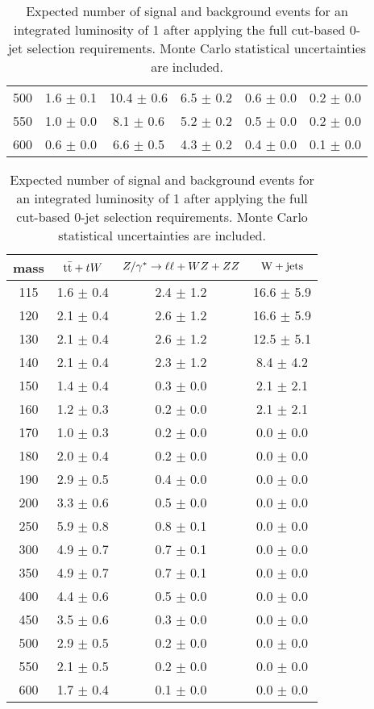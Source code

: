 \begin{table}[!ht]
\begin{center}
{\begin{tabular} {|c|c|c|c|c|c|}
500 &    1.6 $\pm$   0.1 &  10.4	 $\pm$    0.6  &   6.5 $\pm$   0.2 &   0.6 $\pm$   0.0 &   0.2 $\pm$   0.0 \\
550 &    1.0 $\pm$   0.0 &   8.1	 $\pm$    0.6  &   5.2 $\pm$   0.2 &   0.5 $\pm$   0.0 &   0.2 $\pm$   0.0 \\
600 &    0.6 $\pm$   0.0 &   6.6	 $\pm$    0.5  &   4.3 $\pm$   0.2 &   0.4 $\pm$   0.0 &   0.1 $\pm$   0.0 \\
 \hline
  \end{tabular}
  }
 {\normalsize
  \begin{tabular} {|c|c|c|c|}
\hline
  mass    & $\mathrm{t}\bar{\mathrm{t}}+tW$ & $Z/\gamma^*\to\ell\ell+WZ+ZZ$ & $\mathrm{W+jets}$\\
  \hline
  \hline
115 &  1.6 $\pm$	0.4 &	2.4 $\pm$   1.2 &  16.6 $\pm$	5.9  \\
120 &  2.1 $\pm$	0.4 &	2.6 $\pm$   1.2 &  16.6 $\pm$	5.9  \\
130 &  2.1 $\pm$	0.4 &	2.6 $\pm$   1.2 &  12.5 $\pm$	5.1  \\
140 &  2.1 $\pm$	0.4 &	2.3 $\pm$   1.2 &   8.4 $\pm$	4.2  \\
150 &  1.4 $\pm$	0.4 &	0.3 $\pm$   0.0 &   2.1 $\pm$	2.1  \\
160 &  1.2 $\pm$	0.3 &	0.2 $\pm$   0.0 &   2.1 $\pm$	2.1  \\
170 &  1.0 $\pm$	0.3 &	0.2 $\pm$   0.0 &   0.0 $\pm$	0.0  \\
180 &  2.0 $\pm$	0.4 &	0.2 $\pm$   0.0 &   0.0 $\pm$	0.0  \\
190 &  2.9 $\pm$	0.5 &	0.4 $\pm$   0.0 &   0.0 $\pm$	0.0  \\
200 &  3.3 $\pm$	0.6 &	0.5 $\pm$   0.0 &   0.0 $\pm$	0.0  \\
250 &  5.9 $\pm$	0.8 &	0.8 $\pm$   0.1 &   0.0 $\pm$	0.0  \\
300 &  4.9 $\pm$	0.7 &	0.7 $\pm$   0.1 &   0.0 $\pm$	0.0  \\
350 &  4.9 $\pm$	0.7 &	0.7 $\pm$   0.1 &   0.0 $\pm$	0.0  \\
400 &  4.4 $\pm$	0.6 &	0.5 $\pm$   0.0 &   0.0 $\pm$	0.0  \\
450 &  3.5 $\pm$	0.6 &	0.3 $\pm$   0.0 &   0.0 $\pm$	0.0  \\
500 &  2.9 $\pm$	0.5 &	0.2 $\pm$   0.0 &   0.0 $\pm$	0.0  \\
550 &  2.1 $\pm$	0.5 &	0.2 $\pm$   0.0 &   0.0 $\pm$	0.0  \\
600 &  1.7 $\pm$	0.4 &	0.1 $\pm$   0.0 &   0.0 $\pm$	0.0  \\
 \hline
  \end{tabular}
  }
  \caption{Expected number of signal and background events for an 
  integrated luminosity of 1\ifb{} after 
  applying the full cut-based 0-jet selection requirements. Monte Carlo 
  statistical uncertainties are included.}
   \label{tab:cutbase_yields_0j}
  \end{center}
\end{table}
